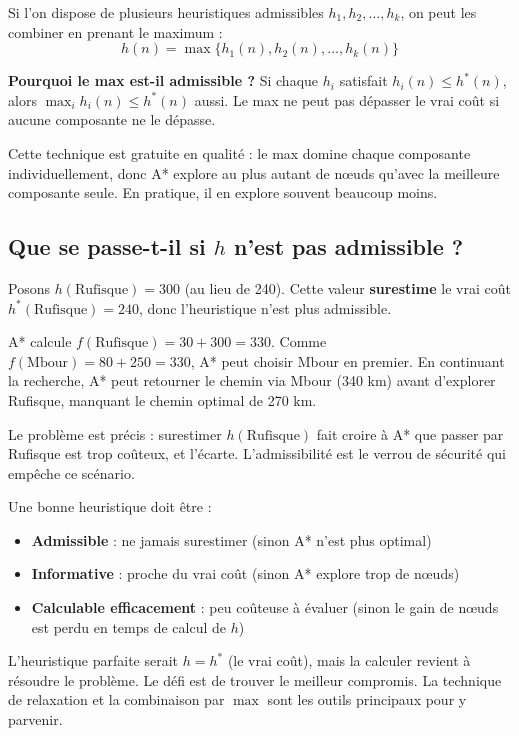 \documentclass[11pt,a4paper]{article}
\begin{document}
Si l'on dispose de plusieurs heuristiques admissibles $h_1, h_2, \ldots, h_k$, on peut les combiner en prenant le maximum :
$$h(n) = \max\{h_1(n), h_2(n), \ldots, h_k(n)\}$$

\textbf{Pourquoi le max est-il admissible ?} Si chaque $h_i$ satisfait $h_i(n) \leq h^*(n)$, alors $\max_i h_i(n) \leq h^*(n)$ aussi. Le max ne peut pas dépasser le vrai coût si aucune composante ne le dépasse.

Cette technique est gratuite en qualité : le max domine chaque composante individuellement, donc A* explore au plus autant de nœuds qu'avec la meilleure composante seule. En pratique, il en explore souvent beaucoup moins.

\subsection{Que se passe-t-il si $h$ n'est pas admissible ?}

\begin{exemplebox}
Posons $h(\text{Rufisque}) = 300$ (au lieu de 240). Cette valeur \textbf{surestime} le vrai coût $h^*(\text{Rufisque}) = 240$, donc l'heuristique n'est plus admissible.

A* calcule $f(\text{Rufisque}) = 30 + 300 = 330$. Comme $f(\text{Mbour}) = 80 + 250 = 330$, A* peut choisir Mbour en premier. En continuant la recherche, A* peut retourner le chemin via Mbour (340 km) avant d'explorer Rufisque, manquant le chemin optimal de 270 km.

Le problème est précis : surestimer $h(\text{Rufisque})$ fait croire à A* que passer par Rufisque est trop coûteux, et l'écarte. L'admissibilité est le verrou de sécurité qui empêche ce scénario.
\end{exemplebox}

\begin{retenirbox}
Une bonne heuristique doit être :
\begin{itemize}
    \item \textbf{Admissible} : ne jamais surestimer (sinon A* n'est plus optimal)
    \item \textbf{Informative} : proche du vrai coût (sinon A* explore trop de nœuds)
    \item \textbf{Calculable efficacement} : peu coûteuse à évaluer (sinon le gain de nœuds est perdu en temps de calcul de $h$)
\end{itemize}
L'heuristique parfaite serait $h = h^*$ (le vrai coût), mais la calculer revient à résoudre le problème. Le défi est de trouver le meilleur compromis. La technique de relaxation et la combinaison par $\max$ sont les outils principaux pour y parvenir.
\end{retenirbox}
\end{document}
